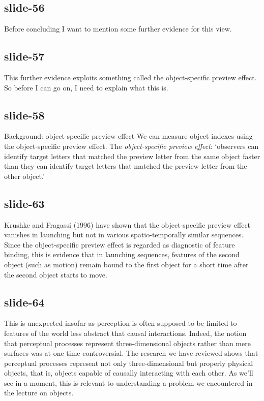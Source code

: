 \documentclass[12pt,\papersize]{extarticle}
\begin{document}
 
\subsection{slide-56}
Before concluding I want to mention some further evidence for this view.
 
 
\subsection{slide-57}
This further evidence exploits something called the object-specific preview effect.
So before I can go on, I need to explain what this is.
 
 
\subsection{slide-58}
Background: object-specific preview effect
We can measure object indexes using the object-specific preview effect.
The \emph{object-specific preview effect}: ‘observers can identify target letters that matched the preview letter from the same object faster than they can identify target letters that matched the preview letter from the other object.’
\citep[p.\ 2]{Krushke:1996ge}
 
 
\subsection{slide-63}
Krushke and Fragassi (1996) have shown that the object-specific preview effect vanishes in launching but not in various spatio-temporally similar sequences. Since the object-specific preview effect is regarded as diagnostic of feature binding, this is evidence that in launching sequences, features of the second object (such as motion) remain bound to the first object for a short time after the second object starts to move.
 
 
\subsection{slide-64}
This is unexpected insofar as perception is often supposed to be limited to features of the world less abstract that causal interactions. Indeed, the notion that perceptual processes represent three-dimensional objects rather than mere surfaces was at one time controversial. The research we have reviewed shows that perceptual processes represent not only three-dimensional but properly physical objects, that is, objects capable of causally interacting with each other.
As we'll see in a moment, this is relevant to understanding a problem we encountered in the lecture on objects.
 
\end{document}
